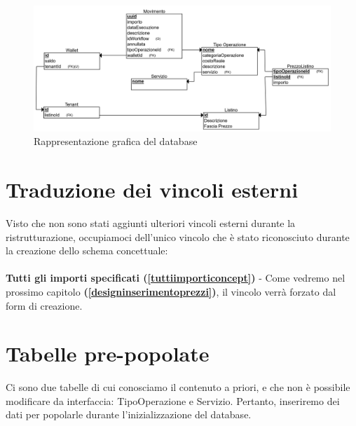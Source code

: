 \begin{figure}[H]
  \centering
  \includegraphics[width=13cm]{images/db-diagrams/rappresentazione-grafica-db.png}
  \caption{Rappresentazione grafica del database}
\end{figure}

\section{Traduzione dei vincoli esterni}
Visto che non sono stati aggiunti ulteriori vincoli esterni durante la ristrutturazione, occupiamoci dell'unico vincolo che \`e stato riconosciuto durante
la creazione dello schema concettuale:
\\\\
\textbf{Tutti gli importi specificati (\ref{tuttiimporticoncept})} - Come vedremo nel prossimo capitolo \textbf{(\ref{designinserimentoprezzi})}, il vincolo verr\`a forzato dal form di creazione.

\section {Tabelle pre-popolate}
Ci sono due tabelle di cui conosciamo il contenuto a priori, e che non \`e possibile modificare da interfaccia: TipoOperazione e Servizio. Pertanto, inseriremo dei dati per popolarle
durante l'inizializzazione del database.
